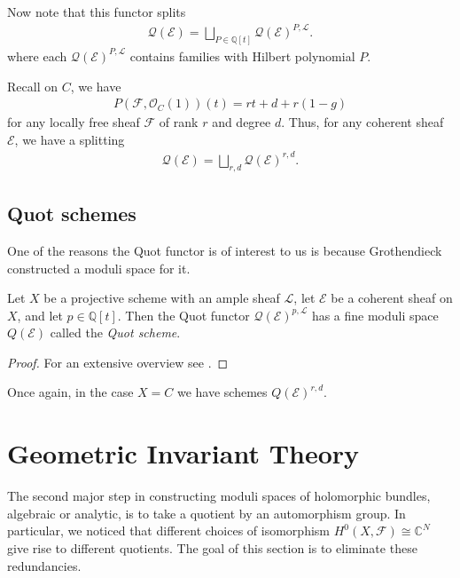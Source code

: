 \documentclass[12pt]{ociamthesis}  %
\begin{document}
Now note that this functor splits
\begin{align*}
  \mathscr Q(\mathcal E)
  = \bigsqcup_{P\in\mathbb{Q}[t]} \mathscr Q(\mathcal E)^{P,\mathcal L}.
\end{align*}
where each $\mathscr Q(\mathcal E)^{P,\mathcal L}$ contains families
with Hilbert polynomial $P$.

\begin{example}
  Recall on $C$, we have
  \begin{align*}
    P(\mathcal F,\mathcal O_C(1))(t) = rt + d + r(1-g)
  \end{align*}
  for any locally free sheaf $\mathcal F$ of rank $r$ and degree $d$.
  Thus, for any coherent sheaf $\mathcal E$, we have a splitting
  \begin{align*}
    \mathscr Q(\mathcal E) = \bigsqcup_{r,d} \mathscr Q(\mathcal E)^{r,d}.
  \end{align*}
  \missingexample
\end{example}

\subsection{Quot schemes}

One of the reasons the Quot functor is of interest to us is because
Grothendieck constructed a moduli space for it. \missingcitation

\begin{theorem}
  Let $X$ be a projective scheme with an ample sheaf $\mathcal L$,
  let $\mathcal E$ be a coherent sheaf on $X$, and let
  $p\in\mathbb{Q}[t]$. Then the Quot functor
  $\mathscr Q(\mathcal E)^{p,\mathcal L}$ has a fine moduli space
  $Q(\mathcal E)$ called the \emph{Quot scheme}.
  \begin{proof}
    For an extensive overview see \cite{hoskins2016}.
  \end{proof}
\end{theorem}

\begin{example}
  Once again, in the case $X=C$ we have schemes
  $Q(\mathcal E)^{r,d}$.
  \missingexample
\end{example}

\missingsection

\section{Geometric Invariant Theory}

The second major step in constructing moduli spaces of holomorphic
bundles, algebraic or analytic, is to take a quotient by an automorphism
group. In particular, we noticed that different choices of isomorphism
$H^0(X,\mathcal F)\cong\mathbb{C}^N$ give rise to different quotients.
The goal of this section is to eliminate these redundancies.
\end{document}
